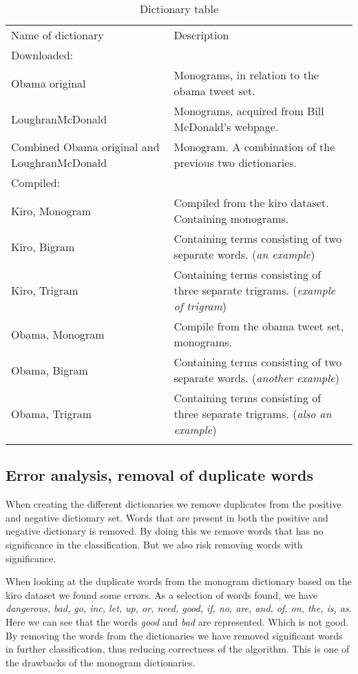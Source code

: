 \begin{table}
\centering
\label{tbl:dictionaries}
\caption{Dictionary table}
\begin{tabular}{ p{5cm} p{7cm} }
Name of dictionary & Description \\
Downloaded:& \\
\hline
Obama original & Monograms, in relation to the obama tweet set. \\
LoughranMcDonald & Monograms, acquired from Bill McDonald's webpage.\\
Combined Obama original and LoughranMcDonald & Monogram. A combination of
the previous two dictionaries. \\

Compiled:& \\
\hline
Kiro, Monogram & Compiled from the kiro dataset. Containing
monograms. \\
Kiro, Bigram &  Containing terms consisting of two separate words. (\textit{an 
example}) \\
Kiro, Trigram & Containing terms consisting of three separate trigrams.
(\textit{example of trigram})\\
Obama, Monogram & Compile from the obama tweet set, monograms. \\
Obama, Bigram & Containing terms consisting of two separate words.
(\textit{another example}) \\
Obama, Trigram & Containing terms consisting of three separate trigrams.
(\textit{also an example})\\

	\label{data:dictionary_list}
\end{tabular}
\end{table}
%

\subsection{Error analysis, removal of duplicate words}
When creating the different dictionaries we remove duplicates from the positive
and negative dictionary set. Words that are present in both the positive and
negative dictionary is removed. By doing this we remove words that has no
significance in the classification. But we also risk removing words with
significance.

When looking at the duplicate words from the monogram dictionary based on the
kiro dataset we found some errors.
As a selection of words found, we have \textit{dangerous, bad, go, inc, let, up, or, need, good, if, no, are, and, of, on, the,
is, as}.
Here we can see that the words \textit{good} and \textit{bad} are represented.
Which is not good. By removing the words from the dictionaries we have removed
significant words in further classification, thus reducing correctness of the
algorithm. This is one of the drawbacks of the monogram dictionaries.

